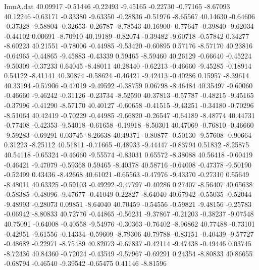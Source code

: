 \begin{filecontents}{ImuA.dat}
  40.09917   -0.51446   -0.22493   -9.45165   -0.22730   -0.77165   -8.67093
  40.12246   -0.63171   -0.33380   -9.63350   -0.28836   -0.51976   -8.65567
  40.14630   -0.64606   -0.37328   -9.58804   -0.32653   -0.26787   -8.78543
  40.16900   -0.77647   -0.39840   -9.62034   -0.44102    0.00691   -8.70910
  40.19189   -0.82074   -0.39482   -9.60718   -0.57842    0.34277   -8.60223
  40.21551   -0.78006   -0.44985   -9.53420   -0.60895    0.57176   -8.57170
  40.23816   -0.64965   -0.44865   -9.45883   -0.43339    0.59465   -8.59460
  40.26129   -0.66640   -0.45224   -9.50309   -0.37233    0.64045   -8.48011
  40.28440   -0.62213   -0.46660   -9.45285   -0.18914    0.54122   -8.41141
  40.30874   -0.58624   -0.46421   -9.42413   -0.40286    0.15957   -8.39614
  40.33194   -0.57906   -0.47019   -9.49592   -0.38759    0.06798   -8.46484
  40.35497   -0.60060   -0.46660   -9.46242   -0.31126   -0.23734   -8.52590
  40.37813   -0.57787   -0.48215   -9.45165   -0.37996   -0.41290   -8.57170
  40.40127   -0.60658   -0.41515   -9.43251   -0.34180   -0.70296   -8.51064
  40.42419   -0.70229   -0.44985   -9.66820   -0.26547   -0.64189   -8.48774
  40.44731   -0.77408   -0.42353   -9.54018   -0.61658   -0.19918   -8.50301
  40.47069   -0.76810   -0.46660   -9.59283   -0.69291    0.03745   -8.26638
  40.49371   -0.80877   -0.50130   -9.57608   -0.90664    0.31223   -8.25112
  40.51811   -0.71665   -0.48933   -9.44447   -0.83794    0.51832   -8.25875
  40.54118   -0.65324   -0.46660   -9.55574   -0.83031    0.65572   -8.38088
  40.56418   -0.60419   -0.46421   -9.47079   -0.59368    0.59465   -8.40378
  40.58716   -0.64008   -0.47378   -9.50190   -0.52499    0.43436   -8.42668
  40.61021   -0.65563   -0.47976   -9.43370   -0.27310    0.55649   -8.48011
  40.63325   -0.59103   -0.49292   -9.47797   -0.40286    0.27407   -8.56407
  40.65638   -0.58385   -0.48096   -9.47677   -0.41049    0.22827   -8.64040
  40.67942   -0.55035   -0.52044   -9.48993   -0.28073    0.09851   -8.64040
  40.70459   -0.54556   -0.59821   -9.48156   -0.25783   -0.06942   -8.80833
  40.72776   -0.44865   -0.56231   -9.37867   -0.21203   -0.38237   -9.07548
  40.75091   -0.64008   -0.40558   -9.54976   -0.30363   -0.76402   -8.96862
  40.77488   -0.73101   -0.42951   -9.61556   -0.14334   -0.59609   -8.79306
  40.79788   -0.83151   -0.40439   -9.57727   -0.48682   -0.22971   -8.75489
  40.82073   -0.67837   -0.42114   -9.47438   -0.49446    0.03745   -8.72436
  40.84360   -0.72024   -0.43549   -9.57967   -0.69291    0.24354   -8.80833
  40.86655   -0.68794   -0.46540   -9.39542   -0.65475    0.41146   -8.81596

\end{filecontents}
